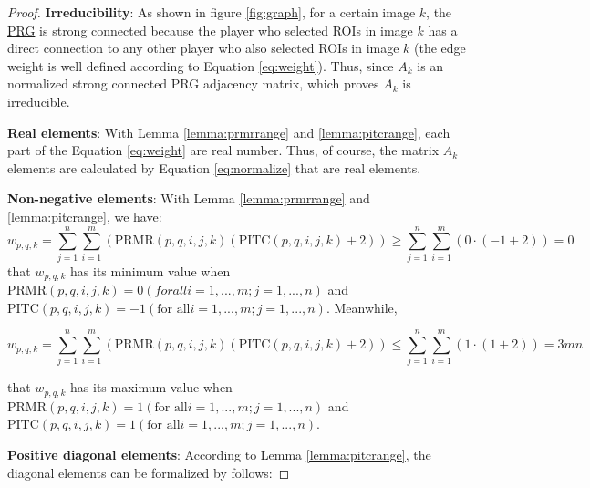\begin{proof}
\textbf{Irreducibility}: As shown in figure \ref{fig:graph}, for a certain image $k$, 
the \hyperref[idx:prg]{PRG} is strong connected because the
player who selected ROIs in image $k$ has a direct connection to any other player who also selected ROIs in image $k$ 
(the edge weight is well defined according to Equation \ref{eq:weight}).
Thus, since $A_k$ is an normalized strong connected PRG adjacency matrix, which proves $A_k$ is irreducible.

\textbf{Real elements}: With Lemma \ref{lemma:prmrrange} and \ref{lemma:pitcrange}, each part of the Equation \ref{eq:weight} 
are real number. Thus, of course, the matrix $A_k$ elements are calculated by Equation \ref{eq:normalize} that are real elements.

\textbf{Non-negative elements}: With Lemma \ref{lemma:prmrrange} and \ref{lemma:pitcrange}, we have:
\[
w_{p,q,k} = 
\sum_{j=1}^{n}{
\sum_{i=1}^{m}{ \left(
  \text{PRMR}(p, q, i, j, k)
  \left(
    \text{PITC}(p, q, i, j, k) + 2
  \right)
\right)}} 
\geq
\sum_{j=1}^{n}{
\sum_{i=1}^{m}{ \left(
  0 \cdot
  \left(
    -1 + 2
  \right)
\right)}} = 0
\]
that $w_{p,q,k}$ has its minimum value when $\text{PRMR}(p, q, i, j, k) = 0 (for all i=1,...,m; j=1,...,n)$ 
and $\text{PITC}(p, q, i, j, k) = -1 (\text{for all} i=1,...,m; j=1,...,n)$. Meanwhile,

\[
w_{p,q,k} = 
\sum_{j=1}^{n}{
\sum_{i=1}^{m}{ \left(
  \text{PRMR}(p, q, i, j, k)
  \left(
    \text{PITC}(p, q, i, j, k) + 2
  \right)
\right)}} 
\leq 
\sum_{j=1}^{n}{
\sum_{i=1}^{m}{ \left(
  1 \cdot
  \left(
    1 + 2
  \right)
\right)}} = 3mn
\]

that $w_{p,q,k}$ has its maximum value when $\text{PRMR}(p, q, i, j, k) = 1 (\text{for all} i=1,...,m; j=1,...,n)$ 
and $\text{PITC}(p, q, i, j, k) = 1 (\text{for all} i=1,...,m; j=1,...,n)$.
  
\textbf{Positive diagonal elements}: According to Lemma \ref{lemma:pitcrange}, 
the diagonal elements can be formalized by follows:


\end{proof}
